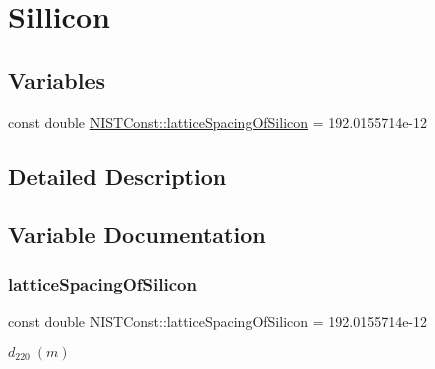 \hypertarget{group___sillicon}{}\section{Sillicon}
\label{group___sillicon}
\subsection*{Variables}
\begin{DoxyCompactItemize}
\item 
const double \hyperlink{group___sillicon_ga439c53134da8a910d17c996b136da7a8}{N\+I\+S\+T\+Const\+::lattice\+Spacing\+Of\+Silicon} = 192.\+0155714e-\/12
\end{DoxyCompactItemize}


\subsection{Detailed Description}


\subsection{Variable Documentation}
\mbox{\label{group___sillicon_ga439c53134da8a910d17c996b136da7a8}} 
\subsubsection{\texorpdfstring{lattice\+Spacing\+Of\+Silicon}{latticeSpacingOfSilicon}}
{\footnotesize\ttfamily const double N\+I\+S\+T\+Const\+::lattice\+Spacing\+Of\+Silicon = 192.\+0155714e-\/12}

$d_{220} \ (m)$ 